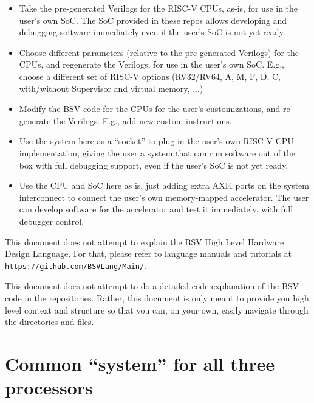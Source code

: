 \documentclass[11pt]{book}
\newcommand{\cf}{\footnotesize\tt}
\begin{document}
\begin{itemize}

\item Take the pre-generated Verilogs for the RISC-V CPUs, as-is, for
use in the user's own SoC.  The SoC provided in these repos allows
developing and debugging software immediately even if the user's SoC
is not yet ready.

\item Choose different parameters (relative to the pre-generated
Verilogs) for the CPUs, and regenerate the Verilogs, for use in the
user's own SoC.  E.g., choose a different set of RISC-V options
(RV32/RV64, A, M, F, D, C, with/without Supervisor and virtual memory,
...)

\item Modify the BSV code for the CPUs for the user's customizations,
and re-generate the Verilogs.  E.g., add new custom instructions.

\item Use the system here as a ``socket'' to plug in the user's own
RISC-V CPU implementation, giving the user a system that can run
software out of the box with full debugging support, even if the
user's SoC is not yet ready.

\item Use the CPU and SoC here as is, just adding extra AXI4 ports on
the system interconnect to connect the user's own memory-mapped
accelerator.  The user can develop software for the accelerator and
test it immediately, with full debugger control.

\end{itemize}

This document does not attempt to explain the BSV High Level Hardware
Design Language.  For that, please refer to language manuals and
tutorials at {\cf https://github.com/BSVLang/Main/}.

This document does not attempt to do a detailed code explanation of
the BSV code in the repositories.  Rather, this document is only meant
to provide you high level context and structure so that you can, on
your own, easily navigate through the directories and files.


\section{Common ``system'' for all three processors}
\end{document}
